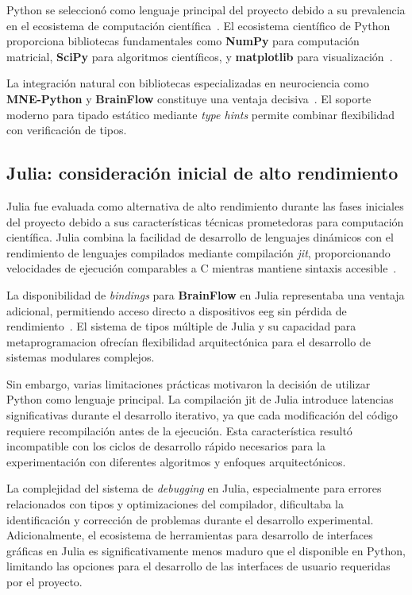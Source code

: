Python se seleccionó como lenguaje principal del proyecto debido a su prevalencia en el ecosistema de computación científica~\cite{gramfort2013meg,delorme2004eeglab}. El ecosistema científico de Python proporciona bibliotecas fundamentales como \textbf{NumPy} para computación matricial, \textbf{SciPy} para algoritmos científicos, y \textbf{matplotlib} para visualización~\cite{van2011numpy,virtanen2020scipy}.

La integración natural con bibliotecas especializadas en neurociencia como \textbf{MNE-Python} y \textbf{BrainFlow} constituye una ventaja decisiva~\cite{gramfort2013meg,brainflow}. El soporte moderno para tipado estático mediante \textit{\gls{type hints}} permite combinar flexibilidad con verificación de tipos.

\subsection{Julia: consideración inicial de alto rendimiento}
\label{subsec:julia_consideracion}

Julia fue evaluada como alternativa de alto rendimiento durante las fases iniciales del proyecto debido a sus características técnicas prometedoras para computación científica. Julia combina la facilidad de desarrollo de lenguajes dinámicos con el rendimiento de lenguajes compilados mediante compilación \textit{\acrfull{jit}}, proporcionando velocidades de ejecución comparables a C mientras mantiene sintaxis accesible~\cite{bezanson2017julia}.

La disponibilidad de \textit{\gls{bindings}} para \textbf{BrainFlow} en Julia representaba una ventaja adicional, permitiendo acceso directo a dispositivos \acrshort{eeg} sin pérdida de rendimiento~\cite{brainflow}. El sistema de tipos múltiple de Julia y su capacidad para \gls{metaprogramacion} ofrecían flexibilidad arquitectónica para el desarrollo de sistemas modulares complejos.

Sin embargo, varias limitaciones prácticas motivaron la decisión de utilizar Python como lenguaje principal. La compilación \acrshort{jit} de Julia introduce latencias significativas durante el desarrollo iterativo, ya que cada modificación del código requiere recompilación antes de la ejecución. Esta característica resultó incompatible con los ciclos de desarrollo rápido necesarios para la experimentación con diferentes algoritmos y enfoques arquitectónicos.

La complejidad del sistema de \textit{debugging} en Julia, especialmente para errores relacionados con tipos y optimizaciones del compilador, dificultaba la identificación y corrección de problemas durante el desarrollo experimental. Adicionalmente, el ecosistema de herramientas para desarrollo de interfaces gráficas en Julia es significativamente menos maduro que el disponible en Python, limitando las opciones para el desarrollo de las interfaces de usuario requeridas por el proyecto.

